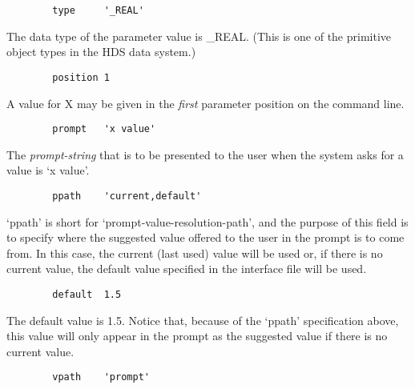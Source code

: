 \begin{small}
\begin{verbatim}
        type     '_REAL'
\end{verbatim}
\end{small}

The data type of the parameter value is \_REAL.
(This is one of the primitive object types in the HDS data system.)

\begin{small}
\begin{verbatim}
        position 1
\end{verbatim}
\end{small}

A value for X may be given in the {\em first} parameter position on the command
line.

\begin{small}
\begin{verbatim}
        prompt   'x value'
\end{verbatim}
\end{small}

The {\em prompt-string} that is to be presented to the user when the system
asks for a value is `x value'.

\begin{small}
\begin{verbatim}
        ppath    'current,default'
\end{verbatim}
\end{small}

`ppath' is short for `prompt-value-resolution-path', and the purpose of this
field is to specify where the suggested value offered to the user in the
prompt is to come from.
In this case, the current (last used) value will be used or, if there is no
current value, the default value specified in the interface file will be used.

\begin{small}
\begin{verbatim}
        default  1.5
\end{verbatim}
\end{small}

The default value is 1.5.
Notice that, because of the `ppath' specification above, this value will only
appear in the prompt as the suggested value if there is no current value.

\begin{small}
\begin{verbatim}
        vpath    'prompt'
\end{verbatim}
\end{small}

